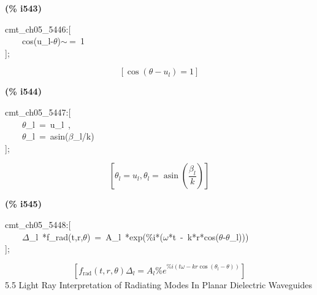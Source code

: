 \documentclass[fleqn]{article}
\begin{document}
\noindent
\begin{minipage}[t]{4.000000em}\color{red}\bfseries
(\% i543)	
\end{minipage}
\begin{minipage}[t]{\textwidth}\color{blue}
cmt\_ch05\_5446:[\\
\ \ \ \ cos(u\_l-\ensuremath{\theta})\ensuremath{\sim\ }=\ 1\\
];
\end{minipage}
\[\displaystyle \tag{\% o543} 
\left[ \cos{\left( \theta -{u_l}\right) }=1\right] \mbox{}
\]


\noindent
\begin{minipage}[t]{4.000000em}\color{red}\bfseries
(\% i544)	
\end{minipage}
\begin{minipage}[t]{\textwidth}\color{blue}
cmt\_ch05\_5447:[\\
\ \ \ \ \ensuremath{\theta}\_l\ =\ u\_l\ ,\\
\ \ \ \ \ensuremath{\theta}\_l\ =\ asin(\ensuremath{\beta}\_l/k)\\
];
\end{minipage}
\[\displaystyle \tag{\% o544} 
\left[ {{\theta }_l}={u_l}\operatorname{,}{{\theta }_l}=\operatorname{asin}\left( \frac{{{\beta }_l}}{k}\right) \right] \mbox{}
\]


\noindent
\begin{minipage}[t]{4.000000em}\color{red}\bfseries
(\% i545)	
\end{minipage}
\begin{minipage}[t]{\textwidth}\color{blue}
cmt\_ch05\_5448:[\\
\ \ \ \ \ensuremath{\Delta}\_l\ *f\_rad(t,r,\ensuremath{\theta})\ =\ A\_l\ *exp(\%i*(\ensuremath{\omega}*t\ -\ k*r*cos(\ensuremath{\theta}-\ensuremath{\theta}\_l)))\\
];
\end{minipage}
\[\displaystyle \tag{\% o545} 
\left[ {f_{\ensuremath{\mathrm{rad}}}}\left( t\operatorname{,}r\operatorname{,}\theta \right)  {{\Delta }_l}={A_l} {{\% e}^{\% i \left( t \omega -k r \cos{\left( {{\theta }_l}-\theta \right) }\right) }}\right] \mbox{}
\]
5.5     Light Ray Interpretation of Radiating Modes In Planar Dielectric  Waveguides
\end{document}
